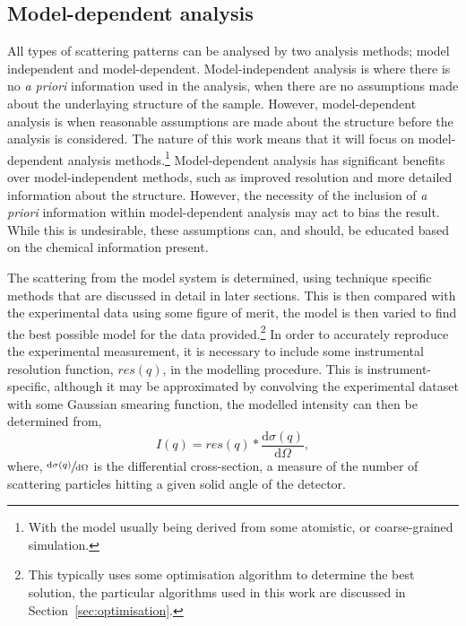 \subsection{Model-dependent analysis}
\label{sec:moddep}
All types of scattering patterns can be analysed by two analysis methods; model independent and model-dependent.
Model-independent analysis is where there is no \emph{a priori} information used in the analysis, when there are no assumptions made about the underlaying structure of the sample. 
However, model-dependent analysis is when reasonable assumptions are made about the structure before the analysis is considered. 
The nature of this work means that it will focus on model-dependent analysis methods.\footnote{With the model usually being derived from some atomistic, or coarse-grained simulation.}
Model-dependent analysis has significant benefits over model-independent methods, such as improved resolution and more detailed information about the structure.
However, the necessity of the inclusion of \emph{a priori} information within model-dependent analysis may act to bias the result.
While this is undesirable, these assumptions can, and should, be educated based on the chemical information present.\autocite[][such as the propensity for twin-tailed phospholipid molecules to form monolayers at an air-water interface or small surfactants to form micelles in solution.]{mccluskey_model-dependent_2018}

The scattering from the model system is determined, using technique specific methods that are discussed in detail in later sections.
This is then compared with the experimental data using some figure of merit, the model is then varied to find the best possible model for the data provided.\footnote{This typically uses some optimisation algorithm to determine the best solution, the particular algorithms used in this work are discussed in Section~\ref{sec:optimisation}.}
In order to accurately reproduce the experimental measurement, it is necessary to include some instrumental resolution function, $res(q)$, in the modelling procedure.
This is instrument-specific, although it may be approximated by convolving the experimental dataset with some Gaussian smearing function, the modelled intensity can then be determined from,\autocite{nelson_towards_2013-1,nelson_towards_2014}
%
\begin{equation}
    I(q) = res(q) * \frac{\text{d}\sigma(q)}{\text{d}\Omega},
\end{equation}
%
where, $\sfrac{\text{d}\sigma(q)}{\text{d}\Omega}$ is the differential cross-section, a measure of the number of scattering particles hitting a given solid angle of the detector.

